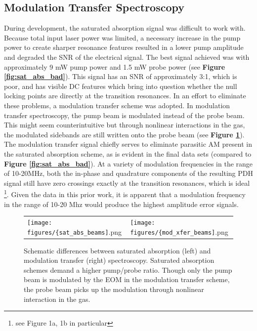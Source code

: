 
\subsection{Modulation Transfer Spectroscopy}

During development, the saturated absorption signal was difficult to work with. Because total input laser power was limited, a necessary increase in the pump power to create sharper resonance features resulted in a lower pump amplitude and degraded the SNR of the electrical signal. The best signal achieved was with approximately 9 mW pump power and 1.5 mW probe power (see \textbf{Figure \ref{fig:sat_abs_bad}}). This signal has an SNR of approximately 3:1, which is poor, and has visible DC features which bring into question whether the null locking points are directly at the transition resonances. In an effort to eliminate these problems, a modulation transfer scheme was adopted. In modulation transfer spectroscopy, the pump beam is modulated instead of the probe beam. This might seem counterintuitive but through nonlinear interactions in the gas, the modulated sidebands are still written onto the probe beam (see \textbf{Figure \ref{fig:spectroscopies}}).   \\

The modulation transfer signal chiefly serves to eliminate parasitic AM present in the saturated absorption scheme, as is evident in the final data sets (compared to \textbf{Figure \ref{fig:sat_abs_bad}}). At a variety of modulation frequencies in the range of 10-20MHz, both the in-phase and quadrature components of the resulting PDH signal still have zero crossings exactly at the transition resonances, which is ideal \cite{0957-0233-19-10-105601}\footnote{see Figure 1a, 1b in particular}. Given the data in this prior work, it is apparent that a modulation frequency in the range of 10-20 Mhz would produce the highest amplitude error signals.

\begin{figure}
  \begin{tabular}{ >{\centering\arraybackslash} m{} >{\centering\arraybackslash} m{} }
    \texttt{[image: figures/\{sat\_abs\_beams]}.png} &
    \texttt{[image: figures/\{mod\_xfer\_beams]}.png} \\
  \end{tabular}
  \caption{Schematic differences between saturated absorption (left) and modulation transfer (right) spectroscopy. Saturated absorption schemes demand a higher pump/probe ratio. Though only the pump beam is modulated by the EOM in the modulation transfer scheme, the probe beam picks up the modulation through nonlinear interaction in the gas.}
  \label{fig:spectroscopies}
\end{figure}